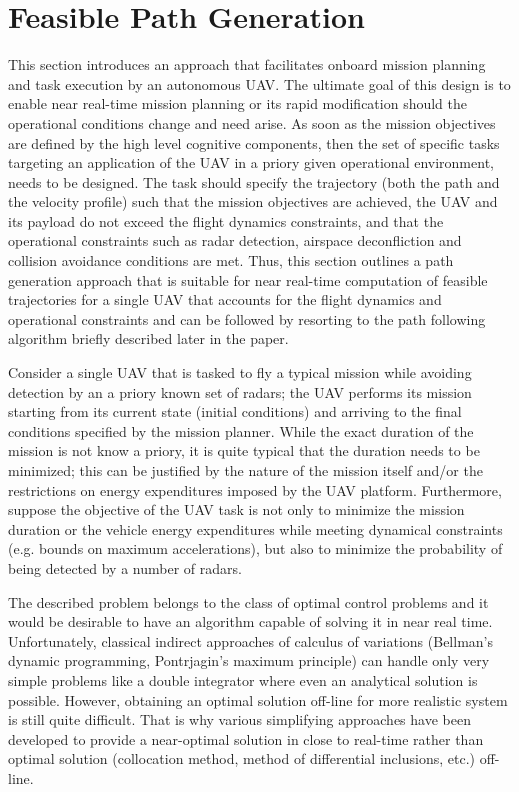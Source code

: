 \documentclass[]{aiaa-tc}%
\begin{document}
\section{Feasible Path Generation}
This section introduces an approach that facilitates onboard mission planning and task
execution by an autonomous UAV. The ultimate goal of this design is to enable near
real-time mission planning or its rapid modification should the operational conditions
change and need arise. As soon as the mission objectives are defined by the high level
cognitive components, then the set of specific tasks targeting an application of the
UAV in a priory given operational environment, needs to be designed. The task should
specify the trajectory (both the path and the velocity profile) such that the mission
objectives are achieved, the UAV and its payload do not exceed the flight dynamics
constraints, and that the operational constraints such as radar detection, airspace
deconfliction and collision avoidance conditions are met. Thus, this section outlines a
path generation approach that is suitable for near real-time computation of feasible
trajectories for a single UAV that accounts for the flight dynamics and operational
constraints and can be followed by resorting to the path following
algorithm\cite{JGCD10_PFL1aug} briefly described later in the paper.

Consider a single UAV that is tasked to fly a typical mission while avoiding detection
by an a priory known set of radars; the UAV performs its mission starting from its
current state (initial conditions) and arriving to the final conditions specified by
the mission planner. While the exact duration of the mission is not know a priory, it
is quite typical that the duration needs to be minimized; this can be justified by the
nature of the mission itself and/or the restrictions on energy expenditures imposed by
the UAV platform. Furthermore, suppose the objective of the UAV task is not only to
minimize the mission duration or the vehicle energy expenditures while meeting
dynamical constraints (e.g. bounds on maximum accelerations), but also to minimize the
probability of being detected by a number of radars.

The described problem belongs to the class of optimal control problems and it would be
desirable to have an algorithm capable of solving it in near real time. Unfortunately,
classical indirect approaches of calculus of variations (Bellman’s dynamic programming,
Pontrjagin’s maximum principle) can handle only very simple problems like a double
integrator where even an analytical solution is possible. However, obtaining an optimal
solution off-line for more realistic system is still quite difficult. That is why
various simplifying approaches have been developed to provide a near-optimal solution
in close to real-time rather than optimal solution (collocation method, method of
differential inclusions, etc.) off-line.
\end{document}
